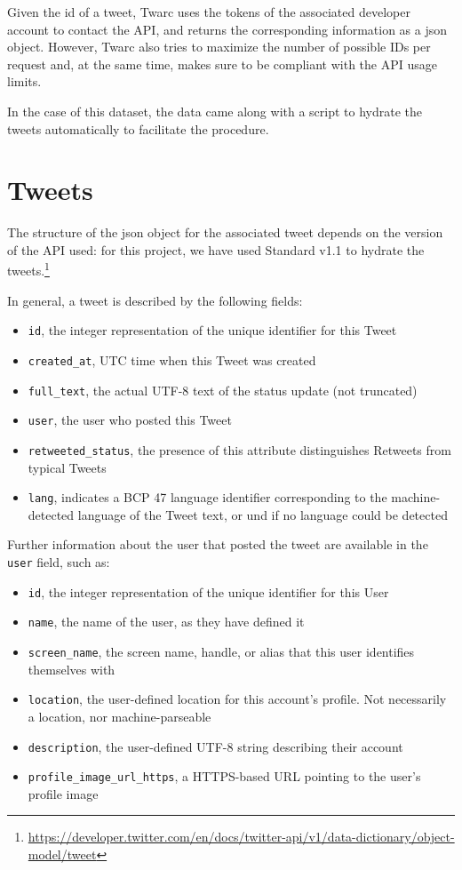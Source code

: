 Given the id of a tweet, Twarc uses the tokens of the associated developer account to contact the API, and returns the corresponding information as a json object. However, Twarc also tries to maximize the number of possible IDs per request and, at the same time, makes sure to be compliant with the API usage limits.

In the case of this dataset, the data came along with a script to hydrate the tweets automatically to facilitate the procedure.

\section{Tweets}
\label{sec:tweets}
The structure of the json object for the associated tweet depends on the version of the API used: for this project, we have used Standard v1.1 to hydrate the tweets.\footnote{\url{https://developer.twitter.com/en/docs/twitter-api/v1/data-dictionary/object-model/tweet}}

In general, a tweet is described by the following fields:

\begin{itemize}
	\item \texttt{id}, the integer representation of the unique identifier for this Tweet
	\item \texttt{created\_at}, UTC time when this Tweet was created
	\item \texttt{full\_text}, the actual UTF-8 text of the status update (not truncated)
	\item \texttt{user}, the user who posted this Tweet
	\item \texttt{retweeted\_status}, the presence of this attribute distinguishes Retweets from typical Tweets
	\item \texttt{lang}, indicates a BCP 47 language identifier corresponding to the machine-detected language of the Tweet text, or und if no language could be detected
\end{itemize}

Further information about the user that posted the tweet are available in the \texttt{user} field, such as:

\begin{itemize}
	\item \texttt{id}, the integer representation of the unique identifier for this User
	\item \texttt{name}, the name of the user, as they have defined it
	\item \texttt{screen\_name}, the screen name, handle, or alias that this user identifies themselves with
	\item \texttt{location}, the user-defined location for this account's profile. Not necessarily a location, nor machine-parseable
	\item \texttt{description}, the user-defined UTF-8 string describing their account
	\item \texttt{profile\_image\_url\_https}, a HTTPS-based URL pointing to the user's profile image
\end{itemize}


